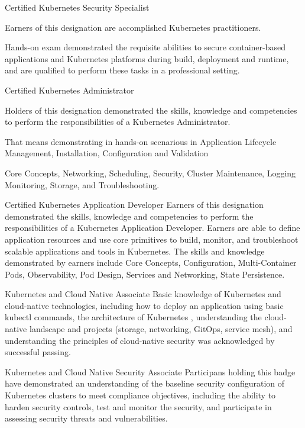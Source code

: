 
\cvmetaevent
{Certified Kubernetes Security Specialist}
{}
{}
{Earners of this designation are accomplished Kubernetes practitioners.

Hands-on exam demonstrated the requisite abilities to secure container-based applications and Kubernetes platforms during build, deployment and runtime, and are qualified to perform these tasks in a professional setting.}

\cvmetaevent
{Certified Kubernetes Administrator}
{}
{}
{Holders of this designation demonstrated the skills, knowledge and competencies to perform the responsibilities of a Kubernetes Administrator.

That means demonstrating in hands-on scenarious in Application Lifecycle Management, Installation, Configuration and Validation

Core Concepts, Networking, Scheduling, Security, Cluster Maintenance, Logging Monitoring, Storage, and Troubleshooting.}

\newpage
\cvmetaevent
{Certified Kubernetes Application Developer}
{}
{}
{Earners of this designation demonstrated the skills, knowledge and competencies to perform the responsibilities of a Kubernetes Application Developer. Earners are able to define application resources and use core primitives to build, monitor, and troubleshoot scalable applications and tools in Kubernetes. The skills and knowledge demonstrated by earners include Core Concepts, Configuration, Multi-Container Pods, Observability, Pod Design, Services and Networking, State Persistence.}

\cvmetaevent
{Kubernetes and Cloud Native Associate}
{}
{}
{Basic knowledge of Kubernetes and cloud-native technologies, including how to deploy an application using basic kubectl commands, the architecture of Kubernetes , understanding the cloud-native landscape and projects (storage, networking, GitOps, service mesh), and understanding the principles of cloud-native security was acknowledged by successful passing.}

\cvmetaevent
{Kubernetes and Cloud Native Security Associate}
{}
{}
{Participans holding this badge have demonstrated an understanding of the baseline security configuration of Kubernetes clusters to meet compliance objectives, including the ability to harden security controls, test and monitor the security, and participate in assessing security threats and vulnerabilities.}
